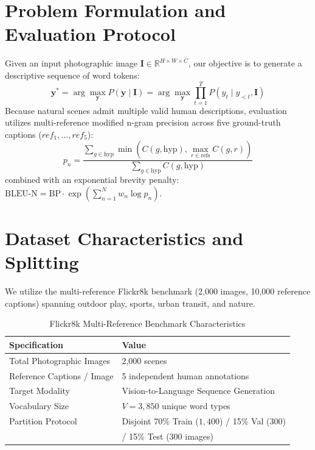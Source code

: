 \documentclass[10pt,journal,compsoc,twocolumn]{IEEEtran}
\begin{document}
\section{Problem Formulation and Evaluation Protocol}
Given an input photographic image $\mathbf{I} \in \mathbb{R}^{H \times W \times C}$, our objective is to generate a descriptive sequence of word tokens:
\begin{equation}
\mathbf{y}^* = \arg\max_{\mathbf{y}} P(\mathbf{y} \mid \mathbf{I}) = \arg\max_{\mathbf{y}} \prod_{t=1}^T P(y_t \mid y_{<t}, \mathbf{I})
\end{equation}
Because natural scenes admit multiple valid human descriptions, evaluation utilizes multi-reference modified n-gram precision across five ground-truth captions ($ref_1, \dots, ref_5$):
\begin{equation}
p_n = \frac{\sum_{g \in \text{hyp}} \min\left(C(g, \text{hyp}), \max_{r \in \text{refs}} C(g, r)\right)}{\sum_{g \in \text{hyp}} C(g, \text{hyp})}
\end{equation}
combined with an exponential brevity penalty: $\text{BLEU-N} = \text{BP} \cdot \exp\left(\sum_{n=1}^N w_n \log p_n\right)$.

\section{Dataset Characteristics and Splitting}
We utilize the multi-reference Flickr8k benchmark (2,000 images, 10,000 reference captions) spanning outdoor play, sports, urban transit, and nature.

\begin{table}[htbp]
\centering
\caption{Flickr8k Multi-Reference Benchmark Characteristics}
\label{tab:c3_stats}
\begin{tabular}{ll}
\toprule
\textbf{Specification} & \textbf{Value} \\
\midrule
Total Photographic Images & 2,000 scenes \\
Reference Captions / Image & 5 independent human annotations \\
Target Modality & Vision-to-Language Sequence Generation \\
Vocabulary Size & $V = 3,850$ unique word types \\
Partition Protocol & Disjoint 70\% Train ($1,400$) / 15\% Val ($300$) \\
                   & / 15\% Test ($300$ images) \\
\bottomrule
\end{tabular}
\end{table}
\end{document}
